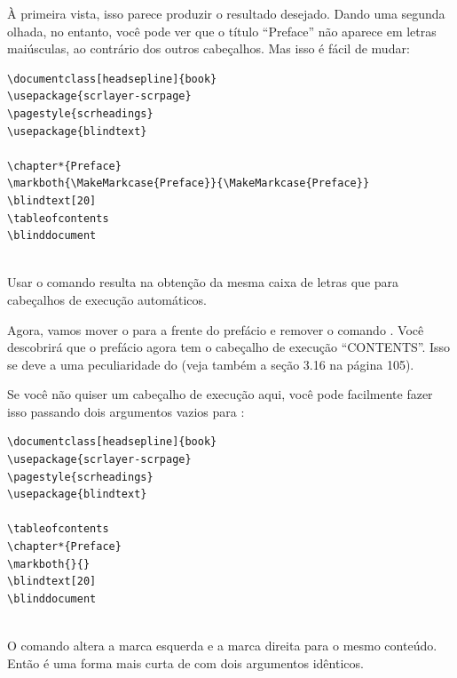 À primeira vista, isso parece produzir o resultado desejado. Dando uma segunda olhada, no entanto, você pode ver que o título “Preface” não aparece em letras maiúsculas, ao contrário dos outros cabeçalhos. Mas isso é fácil de mudar:
\begin{verbatim}
\documentclass[headsepline]{book}
\usepackage{scrlayer-scrpage}
\pagestyle{scrheadings}
\usepackage{blindtext}

\chapter*{Preface}
\markboth{\MakeMarkcase{Preface}}{\MakeMarkcase{Preface}}
\blindtext[20]
\tableofcontents
\blinddocument
   
\end{verbatim}

Usar o comando  resulta na obtenção da mesma caixa de letras que para cabeçalhos de execução automáticos.

Agora, vamos mover o  para a frente do prefácio e remover o comando . Você descobrirá que o prefácio agora tem o cabeçalho de execução “CONTENTS”. Isso se deve a uma peculiaridade do  (veja também a seção 3.16 na página 105).

Se você não quiser um cabeçalho de execução aqui, você pode facilmente fazer isso passando dois argumentos vazios para :
\begin{verbatim}
\documentclass[headsepline]{book}
\usepackage{scrlayer-scrpage}
\pagestyle{scrheadings}
\usepackage{blindtext}

\tableofcontents
\chapter*{Preface}
\markboth{}{}
\blindtext[20]
\blinddocument
    
\end{verbatim}

O comando  altera a marca esquerda e a marca direita para o mesmo conteúdo. Então  é uma forma mais curta de  com dois argumentos idênticos.

